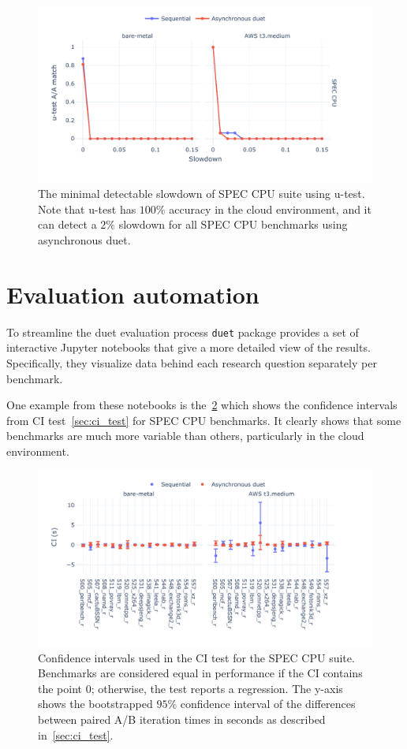 \begin{figure}
	\centering
	\includegraphics[width=1\linewidth]{./figures/mds_utest.pdf}
	\caption{
		The minimal detectable slowdown of SPEC CPU suite using \mbox{u-test}.
		Note that \mbox{u-test} has $100\%$ accuracy in the cloud environment, and it can detect a $2\%$ slowdown for all SPEC CPU benchmarks using asynchronous duet.
	}
	\label{fig:mds_utest}
\end{figure}

\section{Evaluation automation}
\label{sec:automation}

To streamline the duet evaluation process \lstinline{duet} package provides a set of interactive Jupyter notebooks that give a more detailed view of the results.
Specifically, they visualize data behind each research question separately per benchmark.

One example from these notebooks is the~\cref{fig:ci_example} which shows the confidence intervals from CI test~\cref{sec:ci_test} for SPEC CPU benchmarks.
It clearly shows that some benchmarks are much more variable than others, particularly in the cloud environment.

\begin{figure}
	\centering
	\includegraphics[width=1\linewidth]{./figures/ci_example_benchmark.pdf}
	\caption{
		Confidence intervals used in the CI test for the SPEC CPU suite.
		Benchmarks are considered equal in performance if the CI contains the point $0$; otherwise, the test reports a regression.
		The \mbox{y-axis} shows the bootstrapped $95\%$ confidence interval of the differences between paired A/B iteration times in seconds as described in~\cref{sec:ci_test}.
	}
	\label{fig:ci_example}
\end{figure}
